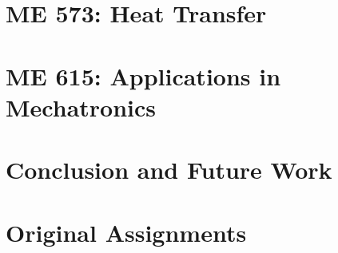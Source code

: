 \documentclass[12pt]{report}
\begin{document}
    \chapter{ME 573: Heat Transfer}
    

    \chapter{ME 615: Applications in Mechatronics}
    
    
    \chapter{Conclusion and Future Work}
    

    \appendix

    \chapter{Original Assignments}
    
    
\end{document}
